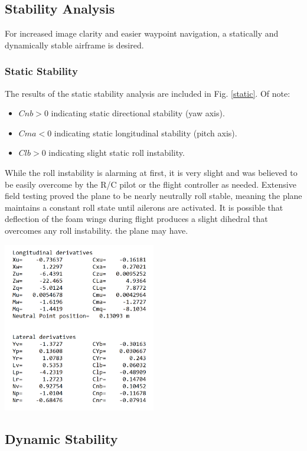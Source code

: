 \documentclass[]{auvsi_doc}
\begin{document}
\subsection{Stability Analysis}
For increased image clarity and easier waypoint navigation, a statically and dynamically stable airframe is desired.
\subsubsection{Static Stability}
The results of the static stability analysis are included in Fig. \ref{static}. Of note:
\begin{itemize}
	\item $Cnb > 0$ indicating static directional stability (yaw axis).
	\item $Cma<0$ indicating static longitudinal stability (pitch axis).
	\item $Clb>0$ indicating slight static roll instability.
\end{itemize}

While the roll instability is alarming at first, it is very slight and was believed to be easily overcome by the R/C pilot or the flight controller as needed. Extensive field testing proved the plane to be nearly neutrally roll stable, meaning the plane maintains a constant roll state until ailerons are activated. It is possible that deflection of the foam wings during flight produces a slight dihedral that overcomes any roll instability. the plane may have.

\begin{center}
	\includegraphics[width=0.50\textwidth]{./figs/staticStability.png}
	\label{static}
\end{center}

\subsection{Dynamic Stability}
\end{document}
